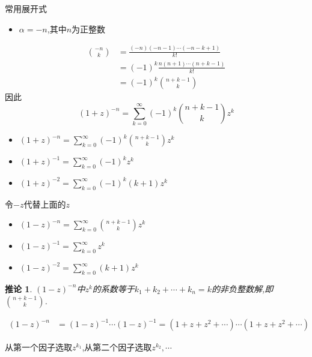 \documentclass[punct]{ctexbeamer}
\newtheorem{cor}[thm]{推论}
\begin{document}
\begin{frame}{常用展开式}
	\begin{itemize}
	\item $ \alpha = -n$,其中$n$为正整数
	\end{itemize}
$$
\begin{aligned}
    \binom{-n}{k}
    &=\frac{(-n)(-n-1) \cdots(-n-k+1)}{k !} \\
    &=(-1)^{k} \frac{n(n+1) \cdots(n+k-1)}{k !} \\
    &=(-1)^{k} \binom{n+k-1}{k}
\end{aligned}
$$
因此
$$(1+z)^{-n}=\sum_{k=0}^\infty (-1)^k \binom{n+k-1}{k} z^k$$
\end{frame}

\begin{frame}
    \begin{itemize}
        \item $(1+z)^{-n}=\sum\limits_{k=0}^\infty (-1)^k \binom{n+k-1}{k} z^k$
        \item $(1+z)^{-1}=\sum\limits_{k=0}^\infty (-1)^k z^k$
        \item  $(1+z)^{-2}=\sum\limits_{k=0}^\infty (-1)^k (k+1) z^k$
    \end{itemize}


    令$-z$代替上面的$z$

    \begin{itemize}
        \item $(1-z)^{-n}=\sum\limits_{k=0}^\infty  \binom{n+k-1}{k} z^k$
        \item $(1-z)^{-1}=\sum\limits_{k=0}^\infty  z^k$
        \item  $(1-z)^{-2}=\sum\limits_{k=0}^\infty (k+1) z^k$
    \end{itemize}
    \begin{cor}
    $(1-z)^{-n}$中$z^k$的系数等于$k_1+k_2+ \cdots +k_n=k$的非负整数解,即  $\binom{n+k-1}{k}$.
\end{cor}

\vspace{-15pt}
    \begin{align*}
        (1-z)^{-n} & =(1-z)^{-1} \cdots (1-z)^{-1}  =(1+z+z^2+\cdots)\cdots(1+z+z^2+\cdots)
    \end{align*}

    从第一个因子选取$z^{k_1}$,从第二个因子选取$z^{k_2},\cdots$


\end{frame}
\end{document}
